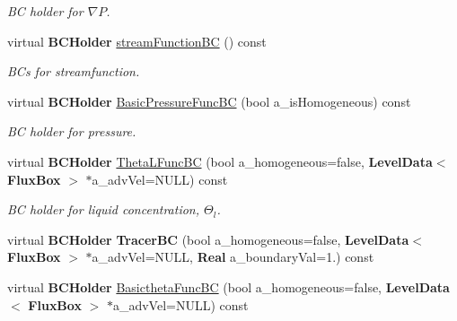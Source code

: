 \begin{DoxyCompactItemize}
\begin{DoxyCompactList}\small\item\em BC holder for $ \nabla P $. \end{DoxyCompactList}\item 
\mbox{\label{class_phys_b_c_util_ab67dfa920f00a906e0ee254fd23755f0}} 
virtual \textbf{ B\+C\+Holder} \hyperlink{class_phys_b_c_util_ab67dfa920f00a906e0ee254fd23755f0}{stream\+Function\+BC} () const
\begin{DoxyCompactList}\small\item\em B\+Cs for streamfunction. \end{DoxyCompactList}\item 
virtual \textbf{ B\+C\+Holder} \hyperlink{class_phys_b_c_util_ad0cfd2f6a56078706972627cf6acd642}{Basic\+Pressure\+Func\+BC} (bool a\+\_\+is\+Homogeneous) const
\begin{DoxyCompactList}\small\item\em BC holder for pressure. \end{DoxyCompactList}\item 
\mbox{\label{class_phys_b_c_util_a0b105308df553508432c655f987e8a55}} 
virtual \textbf{ B\+C\+Holder} \hyperlink{class_phys_b_c_util_a0b105308df553508432c655f987e8a55}{Theta\+L\+Func\+BC} (bool a\+\_\+homogeneous=false, \textbf{ Level\+Data}$<$ \textbf{ Flux\+Box} $>$ $\ast$a\+\_\+adv\+Vel=N\+U\+LL) const
\begin{DoxyCompactList}\small\item\em BC holder for liquid concentration, $ \Theta_l $. \end{DoxyCompactList}\item 
\mbox{\label{class_phys_b_c_util_a5c3af371d310e96f6065f26b5d4472d5}} 
virtual \textbf{ B\+C\+Holder} {\bfseries Tracer\+BC} (bool a\+\_\+homogeneous=false, \textbf{ Level\+Data}$<$ \textbf{ Flux\+Box} $>$ $\ast$a\+\_\+adv\+Vel=N\+U\+LL, \textbf{ Real} a\+\_\+boundary\+Val=1.) const
\item 
\mbox{\label{class_phys_b_c_util_a3bd937de73e4f1c1f354bb56bb6be05e}} 
virtual \textbf{ B\+C\+Holder} \hyperlink{class_phys_b_c_util_a3bd937de73e4f1c1f354bb56bb6be05e}{Basictheta\+Func\+BC} (bool a\+\_\+homogeneous=false, \textbf{ Level\+Data}$<$ \textbf{ Flux\+Box} $>$ $\ast$a\+\_\+adv\+Vel=N\+U\+LL) const

\end{DoxyCompactItemize}

